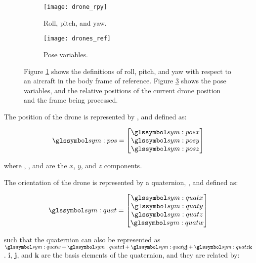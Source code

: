     \begin{figure}[h]
      \centering
      \begin{subfigure}[b]{0.45\textwidth}
	\texttt{[image: drone\_rpy]}
	\caption{Roll, pitch, and yaw.}
	\label{fig:drone_rpy}
      \end{subfigure}
      \hfill
      \begin{subfigure}[b]{0.45\textwidth}
	\texttt{[image: drones\_ref]}
	\caption{Pose variables.}
	\label{fig:drones_ref}
      \end{subfigure}
      \caption[Pose parameter definitions]{Figure \ref{fig:drone_rpy} shows the definitions of roll, pitch, and yaw with respect to an aircraft in the body frame of reference. Figure \ref{fig:drones_ref} shows the pose variables, and the relative positions of the current drone position and the frame being processed.}
    \end{figure}

    The position of the drone is represented by , and defined as:

    \begin{equation}
      \sym{pos} = \begin{bmatrix}
	\sym{posx} \\
	\sym{posy} \\
	\sym{posz} \\
      \end{bmatrix}
    \end{equation}

    where , , and  are the $x$, $y$, and $z$ components.

    The orientation of the drone is represented by a quaternion, , and defined as:

    \begin{equation}
      \sym{quat} = \begin{bmatrix}
	\sym{quatx} \\
	\sym{quaty} \\
	\sym{quatz} \\
	\sym{quatw} \\
      \end{bmatrix}
    \end{equation}

    such that the quaternion can also be represented as $\sym{quatw} + \sym{quatx}\mathbf{i} + \sym{quaty}\mathbf{j} + \sym{quatz}\mathbf{k}$.
    $\mathbf{i}$, $\mathbf{j}$, and $\mathbf{k}$ are the basis elements of the quaternion, and they are related by:

